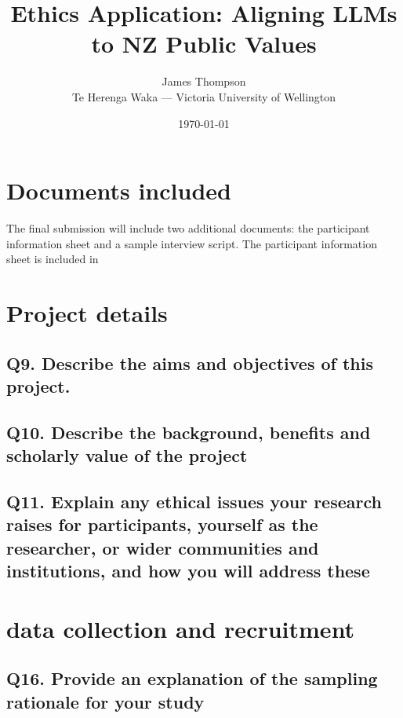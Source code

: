 \documentclass[11pt, a4paper]{article}
\author{James Thompson\\Te Herenga Waka --- Victoria University of Wellington}
\date{\today}
\begin{document}
\title{Ethics Application: Aligning LLMs to NZ Public Values}
\maketitle


\section{Documents included}

The final submission will include two additional documents: the participant information sheet and a sample interview script. The participant information sheet is included in 

\section{Project details}

\subsection{Q9. Describe the aims and objectives of this project.}

\subsection{Q10. Describe the background, benefits and scholarly value of the project}

\subsection{Q11. Explain any ethical issues your research raises for participants, yourself as the researcher, or wider communities and institutions, and how you will address these}

\section{data collection and recruitment}

\subsection{Q16. Provide an explanation of the sampling rationale for your study}
\end{document}
